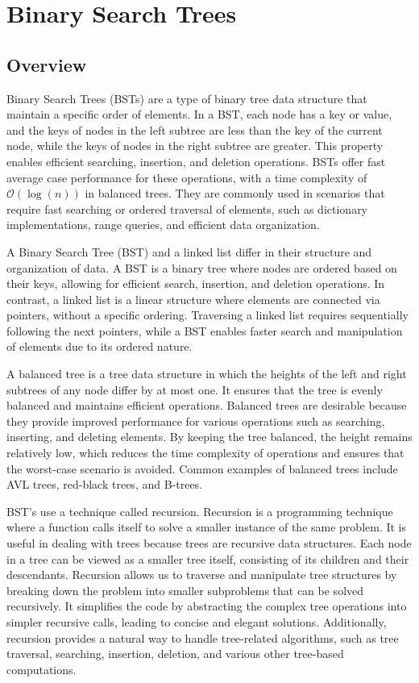 \section*{Binary Search Trees}

\subsection*{Overview}

Binary Search Trees (BSTs) are a type of binary tree data structure that maintain a specific order of elements. In a BST, each node has a key or value, and the keys of nodes in the left subtree are 
less than the key of the current node, while the keys of nodes in the right subtree are greater. This property enables efficient searching, insertion, and deletion operations. BSTs offer fast average 
case performance for these operations, with a time complexity of $\mathcal{O}(\log{(n)})$ in balanced trees. They are commonly used in scenarios that require fast searching or ordered traversal of elements, 
such as dictionary implementations, range queries, and efficient data organization.

A Binary Search Tree (BST) and a linked list differ in their structure and organization of data. A BST is a binary tree where nodes are ordered based on their keys, allowing for efficient search, insertion, 
and deletion operations. In contrast, a linked list is a linear structure where elements are connected via pointers, without a specific ordering. Traversing a linked list requires sequentially following the 
next pointers, while a BST enables faster search and manipulation of elements due to its ordered nature.

A balanced tree is a tree data structure in which the heights of the left and right subtrees of any node differ by at most one. It ensures that the tree is evenly balanced and maintains efficient operations. 
Balanced trees are desirable because they provide improved performance for various operations such as searching, inserting, and deleting elements. By keeping the tree balanced, the height remains relatively 
low, which reduces the time complexity of operations and ensures that the worst-case scenario is avoided. Common examples of balanced trees include AVL trees, red-black trees, and B-trees.

BST's use a technique called recursion. Recursion is a programming technique where a function calls itself to solve a smaller instance of the same problem. It is useful in dealing with trees because trees are 
recursive data structures. Each node in a tree can be viewed as a smaller tree itself, consisting of its children and their descendants. Recursion allows us to traverse and manipulate tree structures by breaking 
down the problem into smaller subproblems that can be solved recursively. It simplifies the code by abstracting the complex tree operations into simpler recursive calls, leading to concise and elegant solutions. 
Additionally, recursion provides a natural way to handle tree-related algorithms, such as tree traversal, searching, insertion, deletion, and various other tree-based computations.

